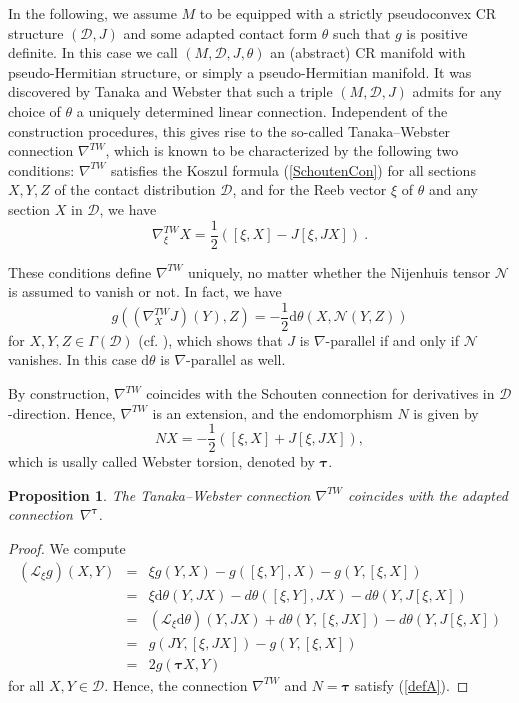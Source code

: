 \documentclass{amsart}
\theoremstyle{plain}
\newtheorem{prop}[theorem]{Proposition}
\theoremstyle{definition}
\newcommand{\bt}{{\boldsymbol{\tau}}}
\newcommand{\1}{\mathbf{1}}
\newcommand{\D}{{\mathcal D}}
\renewcommand{\d}{\mathrm{d}}
\newcommand{\+}{\oplus}
\begin{document}
In the following, we assume $M$ to be equipped with a  strictly pseudoconvex CR structure $(\D,J)$ and some adapted contact form $\theta$
such that $g$ is positive definite. In this case  we call $(M,\D,J,\theta)$ an (abstract) CR manifold with pseudo-Hermitian structure, 
or simply a  pseudo-Hermitian manifold. 
It was discovered by Tanaka \cite{Tanaka}  and Webster \cite{Webster} that such a triple $(M,\D,J)$  admits for any choice of $\theta$ a
uniquely determined  linear connection. Independent of the construction procedures, this gives rise to  the so-called 
Tanaka--Webster connection $\nabla^{TW}$, which is known to be characterized by the following two conditions: 
$\nabla^{TW}$ satisfies the Koszul formula  (\ref{SchoutenCon})
for all sections $X,Y,Z$ of the contact distribution $\D$, and  for the Reeb vector 
$\xi$ of $\theta$ and any section $X$ in $\D$, we have
\[
\nabla_\xi^{TW}X=\frac{1}{2}\left( [\xi,X]-J[\xi,JX]\right)\ .
\]

These conditions define $\nabla^{TW}$ uniquely, no matter whether 
the Nijenhuis tensor $\mathcal{N}$ is assumed to vanish or not. 
In fact, we have 
\[g((\nabla^{TW}_XJ)(Y),Z)=-\frac{1}{2}\d\theta(X,\mathcal{N}(Y,Z) )\]
for $X,Y,Z\in\Gamma(\D)$ (cf. \cite{Tanno}), which shows that 
$J$ is $\nabla$-parallel if and only if $\mathcal{N}$ 
vanishes. 
In this case $\d\theta$ is $\nabla$-parallel as well. 


By construction,  $\nabla^{TW}$ coincides with the Schouten connection for derivatives in $\D$-direction.
Hence,    $\nabla^{TW}$ is an extension, and  the endomorphism $N$ is given by 
$$NX=-\frac{1}{2}\left([\xi,X]+J[\xi,JX]\right),$$ 
which is usally called Webster torsion, denoted by $\bt$. 


\begin{prop}
        The Tanaka--Webster connection $\nabla^{TW}$ coincides with the adapted connection~$\nabla^{\bt}$.
\end{prop}

\begin{proof}We compute 
\begin{eqnarray*}
(\mathcal{L}_\xi g)(X,Y) &=& \xi g(Y,X)-g([\xi,Y],X)-g(Y,[\xi,X])\\
&=& \xi \d\theta(Y,JX)-d\theta([\xi,Y],JX)-d\theta(Y,J[\xi,X])\\
&=& (\mathcal{L}_\xi \d\theta)(Y,JX)+d\theta(Y,[\xi,JX])-d\theta(Y, J[\xi,X])\\
&=& g(JY,[\xi,JX])-g(Y,[\xi,X])\\
&=& 2g(\bt X,Y)
\end{eqnarray*}
for all $X,Y\in \D$. Hence, the connection $\nabla^{TW}$ and $N=\bt$ satisfy (\ref{defA}). \end{proof}
\end{document}
